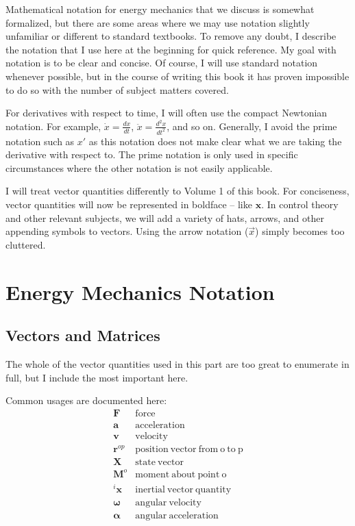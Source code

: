 Mathematical notation for energy mechanics that we discuss is somewhat formalized, but there are some areas where we may use notation slightly unfamiliar or different to standard textbooks. To remove any doubt, I describe the notation that I use here at the beginning for quick reference. My goal with notation is to be clear and concise. Of course, I will use standard notation whenever possible, but in the course of writing this book it has proven impossible to do so with the number of subject matters covered.

For derivatives with respect to time, I will often use the compact Newtonian notation. For example, $\dot{x}=\frac{dx}{dt}$, $\ddot{x}=\frac{d^2x}{dt^2}$, and so on. Generally, I avoid the prime notation such as $x'$ as this notation does not make clear what we are taking the derivative with respect to. The prime notation is only used in specific circumstances where the other notation is not easily applicable.

I will treat vector quantities differently to Volume 1 of this book. For conciseness, vector quantities will now be represented in boldface -- like $\bm{x}$. In control theory and other relevant subjects, we will add a variety of hats, arrows, and other appending symbols to vectors. Using the arrow notation ($\vec{x}$) simply becomes too cluttered.


\newpage
\section*{Energy Mechanics Notation}
\subsection*{Vectors and Matrices}
The whole of the vector quantities used in this part are too great to enumerate in full, but I include the most important here.

Common usages are documented here:
$$\begin{array}{cl}
     \bm{F}&  \mathrm{force}\\
     \bm{a}& \mathrm{acceleration}\\
     \bm{v}& \mathrm{velocity}\\
      \bm{r}^{op}& \mathrm{position \ vector \ from \ o \ to \ p}\\ 
      \bm{X}& \mathrm{state\ vector}\\
      \bm{M}^{o}& \mathrm{moment\ about\ point\ o}\\
      {}^i\bm{x}& \mathrm{inertial\ vector\ quantity}\\
      \bm{\omega}&\mathrm{angular \ velocity}\\
       \bm{\alpha}& \mathrm{angular \ acceleration}\\
\end{array}$$
